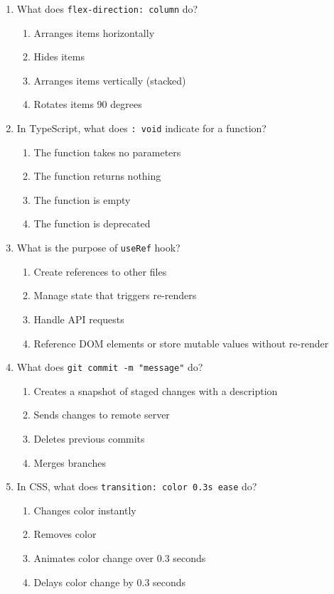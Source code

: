 \documentclass[12pt,a4paper]{article}
\begin{document}
\begin{enumerate}
\item What does \texttt{flex-direction: column} do?
\begin{enumerate}[label=\Alph*)]
    \item Arranges items horizontally
    \item Hides items
    \item Arranges items vertically (stacked)
    \item Rotates items 90 degrees
\end{enumerate}

\item In TypeScript, what does \texttt{: void} indicate for a function?
\begin{enumerate}[label=\Alph*)]
    \item The function takes no parameters
    \item The function returns nothing
    \item The function is empty
    \item The function is deprecated
\end{enumerate}

\item What is the purpose of \texttt{useRef} hook?
\begin{enumerate}[label=\Alph*)]
    \item Create references to other files
    \item Manage state that triggers re-renders
    \item Handle API requests
    \item Reference DOM elements or store mutable values without re-render
\end{enumerate}

\item What does \texttt{git commit -m "message"} do?
\begin{enumerate}[label=\Alph*)]
    \item Creates a snapshot of staged changes with a description
    \item Sends changes to remote server
    \item Deletes previous commits
    \item Merges branches
\end{enumerate}

\item In CSS, what does \texttt{transition: color 0.3s ease} do?
\begin{enumerate}[label=\Alph*)]
    \item Changes color instantly
    \item Removes color
    \item Animates color change over 0.3 seconds
    \item Delays color change by 0.3 seconds
\end{enumerate}


\end{enumerate}
\end{document}
